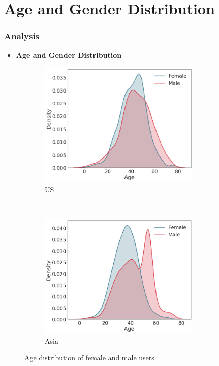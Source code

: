 \documentclass{beamer}
\begin{document}
	\section{Age and Gender Distribution}
	\begin{frame}
		\frametitle{Analysis}
		\begin{itemize}
			\item \textbf{Age and Gender Distribution}\pause
		\end{itemize}
		\begin{figure}[h]
			\centering
			\begin{subfigure}{0.45\textwidth}
				\includegraphics[width=0.85\textwidth]{SS1}
				\caption{US}
			\end{subfigure} \pause
			~
			\begin{subfigure}{0.45\textwidth}
				\includegraphics[width=0.85\textwidth]{SS2}
				\caption{Asia}
			\end{subfigure}
			\caption{Age distribution of female and male users}
		\end{figure}
		
	\end{frame}
\end{document}

